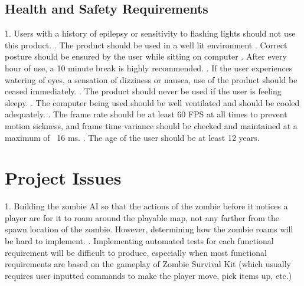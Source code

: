 \documentclass[12pt, titlepage]{article}
\begin{document}
\subsection{Health and Safety Requirements}

1. Users with a history of epilepsy or sensitivity to flashing lights should not use this product.
. The product should be used in a well lit environment
. Correct posture should be ensured by the user while sitting on computer
. After every hour of use, a 10 minute break is highly recommended.
. If the user experiences watering of eyes, a sensation of dizziness or nausea, use of the product should be ceased immediately.
. The product should never be used if the user is feeling sleepy.
. The computer being used should be well ventilated and should be cooled adequately.
. The frame rate should be at least 60 FPS at all times to prevent motion sickness, and frame time variance should be checked and maintained at a maximum of ~16 ms.
. The age of the user should be at least 12 years.


\section{Project Issues}
1. Building the zombie AI so that the actions of the zombie before it notices a player are for it to roam around the playable map, not any farther from the spawn location of the zombie. However, determining how the zombie roams will be hard to implement. 
. Implementing automated tests for each functional requirement will be difficult to produce, especially when most functional requirements are based on the gameplay of Zombie Survival Kit (which usually requires user inputted commands to make the player move, pick items up, etc.)
\end{document}
